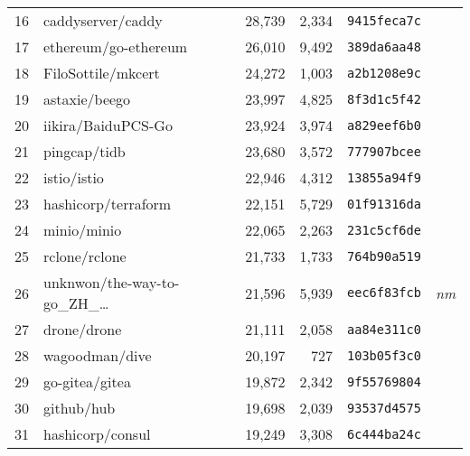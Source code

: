 {\begin{supertabular}{llrrll}
        16  &                  caddyserver/caddy & 28,739 &  2,334 &  \texttt{9415feca7c} &              \\
        17  &               ethereum/go-ethereum & 26,010 &  9,492 &  \texttt{389da6aa48} &              \\
        18  &                 FiloSottile/mkcert & 24,272 &  1,003 &  \texttt{a2b1208e9c} &              \\
        19  &                      astaxie/beego & 23,997 &  4,825 &  \texttt{8f3d1c5f42} &              \\
        20  &                 iikira/BaiduPCS-Go & 23,924 &  3,974 &  \texttt{a829eef6b0} &              \\
        21  &                       pingcap/tidb & 23,680 &  3,572 &  \texttt{777907bcee} &              \\
        22  &                        istio/istio & 22,946 &  4,312 &  \texttt{13855a94f9} &              \\
        23  &                hashicorp/terraform & 22,151 &  5,729 &  \texttt{01f91316da} &              \\
        24  &                        minio/minio & 22,065 &  2,263 &  \texttt{231c5cf6de} &              \\
        25  &                      rclone/rclone & 21,733 &  1,733 &  \texttt{764b90a519} &              \\
        26  &  unknwon/the-way-to-go\_ZH\_\ldots & 21,596 &  5,939 &  \texttt{eec6f83fcb} &  \textit{nm} \\
        27  &                        drone/drone & 21,111 &  2,058 &  \texttt{aa84e311c0} &              \\
        28  &                     wagoodman/dive & 20,197 &    727 &  \texttt{103b05f3c0} &              \\
        29  &                     go-gitea/gitea & 19,872 &  2,342 &  \texttt{9f55769804} &              \\
        30  &                         github/hub & 19,698 &  2,039 &  \texttt{93537d4575} &              \\
        31  &                   hashicorp/consul & 19,249 &  3,308 &  \texttt{6c444ba24c} &              \\

\end{supertabular}}
